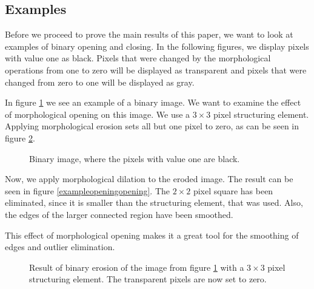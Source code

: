 \documentclass[a4paper,12pt]{article}
\theoremstyle{plain}
\theoremstyle{definition}
\begin{document}
\newpage

\subsection{Examples}

Before we proceed to prove the main results of this paper, we want to look at examples of binary opening and closing. In the following figures, we display pixels with value one as black. Pixels that were changed by the morphological operations from one to zero will be displayed as transparent and pixels that were changed from zero to one will be displayed as gray.

In figure \ref{exampleopeningbefore} we see an example of a binary image. We want to examine the effect of morphological opening on this image. We use a $3 \times 3$ pixel structuring element. Applying morphological erosion sets all but one pixel to zero, as can be seen in figure \ref{exampleopeningerosion}.


\begin{figure}[h]
	\centering
	\caption{Binary image, where the pixels with value one are black.}
	\label{exampleopeningbefore}
\end{figure}

Now, we apply morphological dilation to the eroded image. The result can be seen in figure \ref{exampleopeningopening}. The $2 \times 2$ pixel square has been eliminated, since it is smaller than the structuring element, that was used. Also, the edges of the larger connected region have been smoothed.

This effect of morphological opening makes it a great tool for the smoothing of edges and outlier elimination.\\

\begin{figure}[t!]
	\centering
	\caption{Result of binary erosion of the image from figure \ref{exampleopeningbefore} with a $3 \times 3$ pixel structuring element. The transparent pixels are now set to zero.}
	\label{exampleopeningerosion}
\end{figure}
\end{document}
